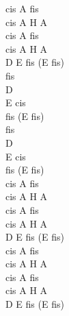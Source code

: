 \documentclass[a5paper, 10pt]{book}
\begin{document}
\begin{minipage}[t]{0.2\textwidth}
  cis A fis\\
  cis A H A\\
  cis A fis\\
  cis A H A\\
  D E fis (E fis)\\

  fis\\
  D\\
  E cis\\
  fis (E fis)\\

  fis\\
  D\\
  E cis\\
  fis (E fis)\\

  cis A fis\\
  cis A H A\\
  cis A fis\\
  cis A H A\\
  D E fis (E fis)\\

  cis A fis\\
  cis A H A\\
  cis A fis\\
  cis A H A\\
  D E fis (E fis)\\
\end{minipage}

\newpage
\end{document}

